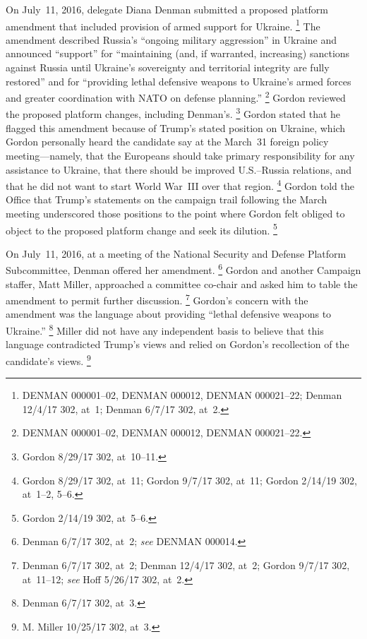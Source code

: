 On July~11, 2016, delegate Diana Denman submitted a proposed platform amendment that included provision of armed support for Ukraine.%
\footnote{DENMAN 000001--02, DENMAN 000012, DENMAN 000021--22;
Denman 12/4/17 302, at~1;
Denman 6/7/17 302, at~2.}
The amendment described Russia's ``ongoing military aggression'' in Ukraine and announced ``support'' for ``maintaining (and, if warranted, increasing) sanctions against Russia until Ukraine's sovereignty and territorial integrity are fully restored'' and for ``providing lethal defensive weapons to Ukraine's armed forces and greater coordination with NATO on defense planning.''%
\footnote{DENMAN 000001--02, DENMAN 000012, DENMAN 000021--22.}
Gordon reviewed the proposed platform changes, including Denman's.%
\footnote{Gordon 8/29/17 302, at~10--11.}
Gordon stated that he flagged this amendment because of Trump's stated position on Ukraine, which Gordon personally heard the candidate say at the March~31 foreign policy meeting---namely, that the Europeans should take primary responsibility for any assistance to Ukraine, that there should be improved U.S.--Russia relations, and that he did not want to start World War~III over that region.%
\footnote{Gordon 8/29/17 302, at~11;
Gordon 9/7/17 302, at~11;
Gordon 2/14/19 302, at~1--2, 5--6.}
Gordon told the Office that Trump's statements on the campaign trail following the March meeting underscored those positions to the point where Gordon felt obliged to object to the proposed platform change and seek its dilution.%
\footnote{Gordon 2/14/19 302, at~5--6.}

On July~11, 2016, at a meeting of the National Security and Defense Platform Subcommittee, Denman offered her amendment.%
\footnote{Denman 6/7/17 302, at~2;
\textit{see} DENMAN 000014.}
Gordon and another Campaign staffer, Matt Miller, approached a committee co-chair and asked him to table the amendment to permit further discussion.%
\footnote{Denman 6/7/17 302, at~2;
Denman 12/4/17 302, at~2;
Gordon 9/7/17 302, at~11--12;
\textit{see} Hoff 5/26/17 302, at~2.}
Gordon's concern with the amendment was the language about providing ``lethal defensive weapons to Ukraine.''%
\footnote{Denman 6/7/17 302, at~3.}
Miller did not have any independent basis to believe that this language contradicted Trump's views and relied on Gordon's recollection of the candidate's views.%
\footnote{M. Miller 10/25/17 302, at~3.}

